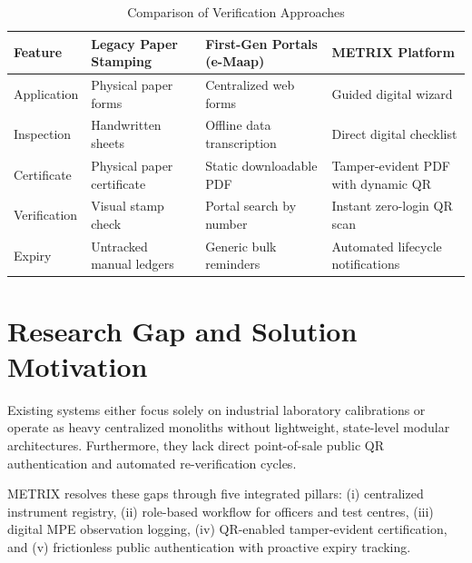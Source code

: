 \begin{table}[htbp]
\centering
\small
\caption{Comparison of Verification Approaches}
\label{tab:literature_comparison}
\renewcommand{\arraystretch}{1.15}
\begin{tabular}{|l|p{3.5cm}|p{3.8cm}|p{4.2cm}|}
\hline
\textbf{Feature} & \textbf{Legacy Paper Stamping} & \textbf{First-Gen Portals (e-Maap)} & \textbf{METRIX Platform} \\ \hline
Application & Physical paper forms & Centralized web forms & Guided digital wizard \\ \hline
Inspection & Handwritten sheets & Offline data transcription & Direct digital checklist \\ \hline
Certificate & Physical paper certificate & Static downloadable PDF & Tamper-evident PDF with dynamic QR \\ \hline
Verification & Visual stamp check & Portal search by number & Instant zero-login QR scan \\ \hline
Expiry & Untracked manual ledgers & Generic bulk reminders & Automated lifecycle notifications \\ \hline
\end{tabular}
\end{table}

\section{Research Gap and Solution Motivation}
Existing systems either focus solely on industrial laboratory calibrations or operate as heavy centralized monoliths without lightweight, state-level modular architectures. Furthermore, they lack direct point-of-sale public QR authentication and automated re-verification cycles. 

METRIX resolves these gaps through five integrated pillars: (i) centralized instrument registry, (ii) role-based workflow for officers and test centres, (iii) digital MPE observation logging, (iv) QR-enabled tamper-evident certification, and (v) frictionless public authentication with proactive expiry tracking.
